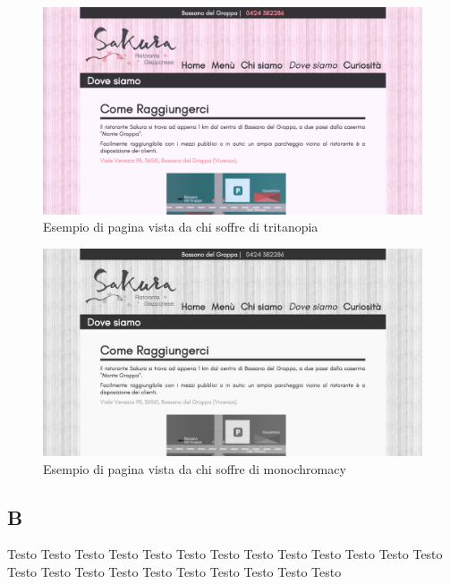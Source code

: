 \documentclass[../relazione.tex]{subfiles}
\begin{document}
	\begin{figure}[H]
	\centering
		\includegraphics[width=\textwidth]{images/colorblindness/tritanopia}
		\caption{Esempio di pagina vista da chi soffre di tritanopia}
		\label{fig:Esempio di pagina vista da chi soffre di tritanopia}
	\end{figure}
	\begin{figure}[H]
	\centering
		\includegraphics[width=\textwidth]{images/colorblindness/monochromacy}
		\caption{Esempio di pagina vista da chi soffre di monochromacy}
		\label{fig:Esempio di pagina vista da chi soffre di monochromacy}
	\end{figure}
	\subsection{B}
	Testo Testo Testo Testo Testo Testo Testo Testo Testo Testo Testo Testo Testo Testo Testo Testo Testo Testo Testo Testo Testo Testo Testo 
\end{document}
